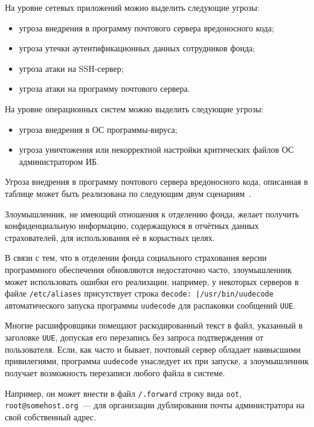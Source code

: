 \point На уровне сетевых приложений можно выделить следующие угрозы:

\begin{itemize}
\item угроза внедрения в программу почтового сервера вредоносного кода;
\item угроза утечки аутентификационных данных сотрудников фонда;
\item угроза атаки на SSH-сервер;
\item угроза атаки на программу почтового сервера.
\end{itemize}

\point На уровне операционных систем можно выделить следующие угрозы:

\begin{itemize}
\item угроза внедрения в ОС программы-вируса;
\item угроза уничтожения или некорректной настройки критических файлов
  ОС администратором ИБ.
\end{itemize}

\point Угроза внедрения в программу почтового сервера вредоносного
кода, описанная в таблице может быть реализована по следующим двум
сценариям~\cite{3}.

\point Злоумышленник, не имеющий отношения к отделению фонда, желает
получить конфиденциальную информацию, содержащуюся в отчётных данных
страхователей, для использования её в корыстных целях.

В связи с тем, что в отделении фонда социального страхования версии
программного обеспечения обновляются недостаточно часто, злоумышленник
может использовать ошибки его реализации, например, у некоторых
серверов в файле \texttt{/etc/aliases} присутствует строка
\texttt{decode: |/usr/bin/uudecode} автоматического запуска программы
\texttt{uudecode} для распаковки сообщений \texttt{UUE}.

Многие расшифровщики помещают раскодированный текст в файл, указанный
в заголовке \texttt{UUE}, допуская его перезапись без запроса
подтверждения от пользователя. Если, как часто и бывает, почтовый
сервер обладает наивысшими привилегиями, программа \texttt{uudecode}
унаследует их при запуске, а злоумышленник получает возможность
перезаписи любого файла в системе.

Например, он может внести в файл \texttt{/.forward} строку вида
\texttt{oot}, \texttt{root@somehost.org}~--- для организации
дублирования почты администратора на свой собственный адрес.

